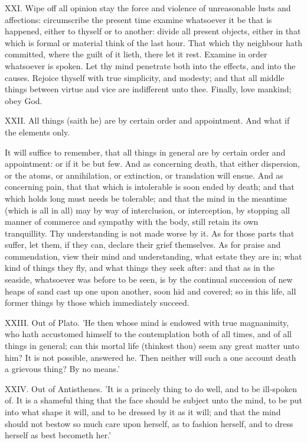 XXI. Wipe off all opinion stay the force and violence of unreasonable
lusts and affections: circumscribe the present time examine whatsoever it
be that is happened, either to thyself or to another: divide all present
objects, either in that which is formal or material think of the last
hour. That which thy neighbour hath committed, where the guilt of it
lieth, there let it rest. Examine in order whatsoever is spoken. Let thy
mind penetrate both into the effects, and into the causes. Rejoice thyself
with true simplicity, and modesty; and that all middle things between
virtue and vice are indifferent unto thee. Finally, love mankind; obey
God.

XXII. All things (saith he) are by certain order and appointment. And
what if the elements only.

It will suffice to remember, that all things in general are by certain
order and appointment: or if it be but few. And as concerning death, that
either dispersion, or the atoms, or annihilation, or extinction, or
translation will ensue. And as concerning pain, that that which is
intolerable is soon ended by death; and that which holds long must needs
be tolerable; and that the mind in the meantime (which is all in all) may
by way of interclusion, or interception, by stopping all manner of
commerce and sympathy with the body, still retain its own tranquillity.
Thy understanding is not made worse by it. As for those parts that suffer,
let them, if they can, declare their grief themselves. As for praise and
commendation, view their mind and understanding, what estate they are in;
what kind of things they fly, and what things they seek after: and that as
in the seaside, whatsoever was before to be seen, is by the continual
succession of new heaps of sand cast up one upon another, soon hid and
covered; so in this life, all former things by those which immediately
succeed.

XXIII. Out of Plato. 'He then whose mind is endowed with true
magnanimity, who hath accustomed himself to the contemplation both of all
times, and of all things in general; can this mortal life (thinkest thou)
seem any great matter unto him? It is not possible, answered he. Then
neither will such a one account death a grievous thing? By no means.'

XXIV. Out of Antisthenes. 'It is a princely thing to do well, and to be
ill-spoken of. It is a shameful thing that the face should be subject unto
the mind, to be put into what shape it will, and to be dressed by it as it
will; and that the mind should not bestow so much care upon herself, as to
fashion herself, and to dress herself as best becometh her.'

